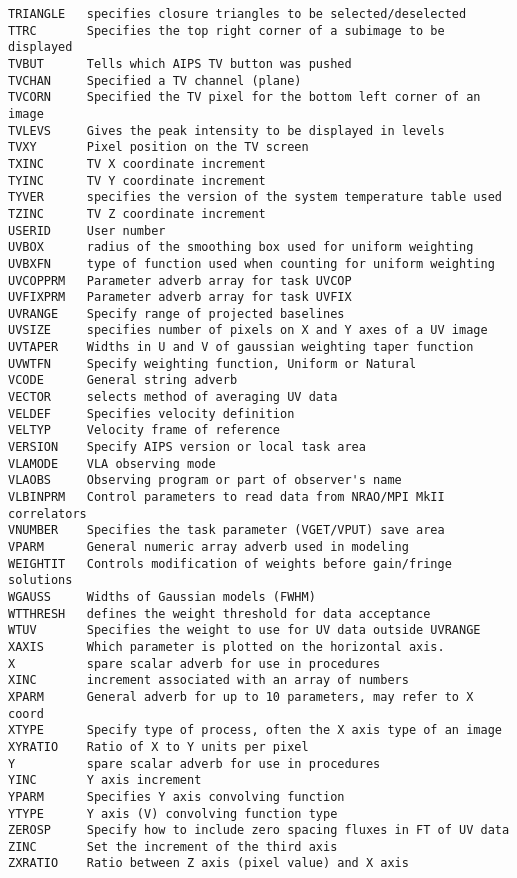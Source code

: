 \begin{verbatim}
TRIANGLE   specifies closure triangles to be selected/deselected
TTRC       Specifies the top right corner of a subimage to be displayed
TVBUT      Tells which AIPS TV button was pushed
TVCHAN     Specified a TV channel (plane)
TVCORN     Specified the TV pixel for the bottom left corner of an image
TVLEVS     Gives the peak intensity to be displayed in levels
TVXY       Pixel position on the TV screen
TXINC      TV X coordinate increment
TYINC      TV Y coordinate increment
TYVER      specifies the version of the system temperature table used
TZINC      TV Z coordinate increment
USERID     User number
UVBOX      radius of the smoothing box used for uniform weighting
UVBXFN     type of function used when counting for uniform weighting
UVCOPPRM   Parameter adverb array for task UVCOP
UVFIXPRM   Parameter adverb array for task UVFIX
UVRANGE    Specify range of projected baselines
UVSIZE     specifies number of pixels on X and Y axes of a UV image
UVTAPER    Widths in U and V of gaussian weighting taper function
UVWTFN     Specify weighting function, Uniform or Natural
VCODE      General string adverb
VECTOR     selects method of averaging UV data
VELDEF     Specifies velocity definition
VELTYP     Velocity frame of reference
VERSION    Specify AIPS version or local task area
VLAMODE    VLA observing mode
VLAOBS     Observing program or part of observer's name
VLBINPRM   Control parameters to read data from NRAO/MPI MkII correlators
VNUMBER    Specifies the task parameter (VGET/VPUT) save area
VPARM      General numeric array adverb used in modeling
WEIGHTIT   Controls modification of weights before gain/fringe solutions
WGAUSS     Widths of Gaussian models (FWHM)
WTTHRESH   defines the weight threshold for data acceptance
WTUV       Specifies the weight to use for UV data outside UVRANGE
XAXIS      Which parameter is plotted on the horizontal axis.
X          spare scalar adverb for use in procedures
XINC       increment associated with an array of numbers
XPARM      General adverb for up to 10 parameters, may refer to X coord
XTYPE      Specify type of process, often the X axis type of an image
XYRATIO    Ratio of X to Y units per pixel
Y          spare scalar adverb for use in procedures
YINC       Y axis increment
YPARM      Specifies Y axis convolving function
YTYPE      Y axis (V) convolving function type
ZEROSP     Specify how to include zero spacing fluxes in FT of UV data
ZINC       Set the increment of the third axis
ZXRATIO    Ratio between Z axis (pixel value) and X axis
\end{verbatim}\eve

